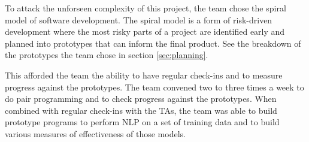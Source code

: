 
To attack the unforseen complexity of this project, the team
chose the spiral model of software development.
The spiral model is a form of risk-driven development where the most
risky parts of a project are identified early and planned into
prototypes that can inform the final product.
See the breakdown of the prototypes the team chose in section
\ref{sec:planning}.

This afforded the team the ability to have regular check-ins and to measure 
progress against the prototypes.
The team convened two to three times a week to do pair programming and
to check progress against the prototypes.
When combined with regular check-ins with the TAs, the team was able to
build prototype programs to perform NLP on a set of training data and
to build various measures of effectiveness of those models.

